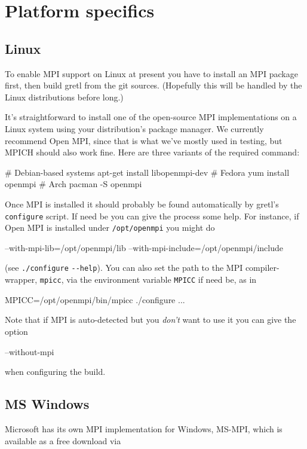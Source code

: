 \documentclass{article}
\begin{document}
\section{Platform specifics}
\label{sec:platforms}

\subsection{Linux}
\label{subsec:linux}

To enable MPI support on Linux at present you have to install an MPI
package first, then build gretl from the git sources. (Hopefully this
will be handled by the Linux distributions before long.)

It's straightforward to install one of the open-source MPI
implementations on a Linux system using your distribution's package
manager. We currently recommend \textsf{Open MPI}, since that is what
we've mostly used in testing, but \textsf{MPICH} should also work
fine.  Here are three variants of the required command:
\begin{code}
# Debian-based systems
apt-get install libopenmpi-dev
# Fedora
yum install openmpi
# Arch
pacman -S openmpi
\end{code}

Once MPI is installed it should probably be found automatically by
gretl's \texttt{configure} script. If need be you can give the process
some help. For instance, if \textsf{Open MPI} is installed under
\texttt{/opt/openmpi} you might do
\begin{code}
--with-mpi-lib=/opt/openmpi/lib
--with-mpi-include=/opt/openmpi/include
\end{code}
(see \texttt{./configure} \verb|--help|). You can also set the path
to the MPI compiler-wrapper, \texttt{mpicc}, via the environment
variable \texttt{MPICC} if need be, as in
\begin{code}
MPICC=/opt/openmpi/bin/mpicc ./configure ...
\end{code}

Note that if MPI is auto-detected but you \emph{don't} want to use it
you can give the option 
\begin{code}
--without-mpi
\end{code}
when configuring the build.

\subsection{MS Windows}

Microsoft has its own MPI implementation for Windows, \textsf{MS-MPI},
which is available as a free download via
\end{document}

